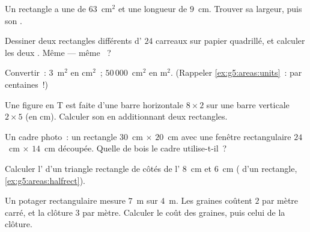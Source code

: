 \begin{exercise}[$\star$]\label{exo:g5:areas:3}
Un rectangle a une  de $63$~cm$^2$ et une longueur de $9$~cm.
Trouver sa largeur, puis son .
\end{exercise}

\begin{exercise}[$\star$]\label{exo:g5:areas:4}
Dessiner deux rectangles différents d' $24$ carreaux sur papier
quadrillé, et calculer les deux . Même  --- même
~?
\end{exercise}

\begin{exercise}[$\star$]\label{exo:g5:areas:5}
Convertir~: $3$~m$^2$ en cm$^2$~; \quad $50\,000$~cm$^2$ en m$^2$.
(Rappeler \cref{ex:g5:areas:units}~: par centaines~!)
\end{exercise}

\begin{exercise}[$\star$]\label{exo:g5:areas:6}
Une figure en T est faite d'une barre horizontale $8 \times 2$ sur
une barre verticale $2 \times 5$ (en cm). Calculer son  en
additionnant deux rectangles.
\end{exercise}

\begin{exercise}[$\star$]\label{exo:g5:areas:7}
Un cadre photo~: un rectangle $30$~cm $\times$ $20$~cm avec une
fenêtre rectangulaire $24$~cm $\times$ $14$~cm découpée. Quelle
 de bois le cadre utilise-t-il~?
\end{exercise}

\begin{exercise}[$\star$]\label{exo:g5:areas:8}
Calculer l' d'un triangle rectangle de côtés de l'
$8$~cm et $6$~cm ( d'un rectangle,
\cref{ex:g5:areas:halfrect}).
\end{exercise}

\begin{exercise}[$\star$]\label{exo:g5:areas:9}
Un potager rectangulaire mesure $7$~m sur $4$~m. Les graines
coûtent $2$ par mètre carré, et la clôture $3$ par mètre. Calculer
le coût des graines, puis celui de la clôture.
\end{exercise}

